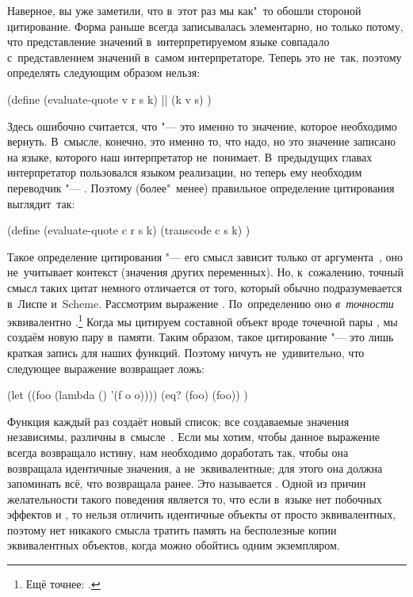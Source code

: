 Наверное, вы уже заметили, что в~этот раз мы как"~то обошли стороной
цитирование. Форма  раньше всегда записывалась элементарно, но только
потому, что представление значений в~интерпретируемом языке совпадало
с~представлением значений в~самом интерпретаторе. Теперь это не~так, поэтому
определять  следующим образом нельзя:

\begin{code:lisp}
(define (evaluate-quote v r s k)  ||
  (k v s) )
\end{code:lisp}

Здесь ошибочно считается, что  "--- это именно то значение, которое
необходимо вернуть. В~смысле, конечно, это именно то, что надо, но это значение
записано на языке, которого наш интерпретатор не~понимает. В~предыдущих главах
интерпретатор пользовался языком реализации, но теперь ему необходим переводчик
"--- . Поэтому (более"~менее) правильное определение цитирования
выглядит~так:

\begin{code:lisp}
(define (evaluate-quote c r s k)
  (transcode c s k) )
\end{code:lisp}

Такое определение цитирования  "--- его смысл зависит
только от аргумента~, оно не~учитывает контекст (значения других
переменных). Но, к~сожалению, точный смысл таких цитат немного отличается от
того, который обычно подразумевается в~Лиспе и~Scheme. Рассмотрим выражение
. По~определению оно \emph{в~точности} эквивалентно
.\footnote*{Ещё точнее: .}
Когда мы цитируем составной объект вроде точечной пары , мы создаём
новую пару в~памяти. Таким образом, такое цитирование "--- это лишь краткая
запись для наших функций. Поэтому ничуть не~удивительно, что
следующее выражение возвращает ложь:

\begin{code:lisp}
(let ((foo (lambda () '(f o o))))
  (eq? (foo) (foo)) )
\end{code:lisp}

Функция  каждый раз создаёт новый список; все создаваемые значения
независимы, различны в~смысле~. Если мы хотим, чтобы данное выражение
всегда возвращало истину, нам необходимо доработать  так,
чтобы она возвращала идентичные значения, а не~эквивалентные; для этого она
должна запоминать всё, что возвращала ранее. Это называется .
Одной из причин желательности такого поведения является то, что если в~языке нет
побочных эффектов и , то нельзя отличить идентичные объекты от просто
эквивалентных, поэтому нет никакого смысла тратить память на бесполезные копии
эквивалентных объектов, когда можно обойтись одним экземпляром.

